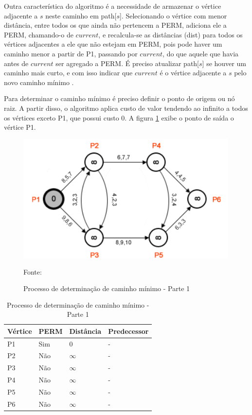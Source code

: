 Outra característica do algoritmo é a necessidade de armazenar o vértice adjacente
a $s$ neste caminho em path[$s$]. Selecionando o vértice com menor distância, entre todos os que ainda não pertencem
a PERM, adiciona ele a PERM, chamando-o de $current$, e recalcula-se as distâncias (dist) para todos os vértices
adjacentes a ele que não estejam em PERM, pois pode haver um caminho menor a partir de P1, passando por $current$, 
do que aquele que havia antes de $current$ ser agregado a PERM. É preciso atualizar path[$s$] se houver um caminho
mais curto, e com isso indicar que $current$ é o vértice adjacente a $s$ pelo novo caminho mínimo \cite{leonard}.

Para determinar o caminho mínimo é preciso definir o ponto de origem ou nó raiz. A partir disso, o algoritmo
aplica custo de valor tendendo ao infinito a todos os vértices exceto P1, que possui custo 0. A figura \ref{fig:leo2} exibe
o ponto de saída o vértice P1.

\begin{figure}[htbp]
\centering
 \includegraphics[width=.55\textwidth]{chapters/fig/leo2.png}
\caption{Processo de determinação de caminho mínimo - Parte 1}
Fonte: \cite{leonard}
\label{fig:leo2}
\end{figure}
\FloatBarrier
\begin{table}[htbp]
	\centering
	\begin{tabular}{l l l l}
	\toprule
	Vértice & PERM & Distância & Predecessor\\
	\midrule
	P1 & Sim & 0 & - \\
	P2 & Não & $\infty$ & - \\
	P3 & Não & $\infty$ & - \\
	P4 & Não & $\infty$ & - \\
	P5 & Não & $\infty$ & - \\
	P6 & Não & $\infty$ & - \\
	\bottomrule
	\end{tabular}
\caption{Processo de determinação de caminho mínimo - Parte 1}
 \label{tab:leotab1}
\end{table}

